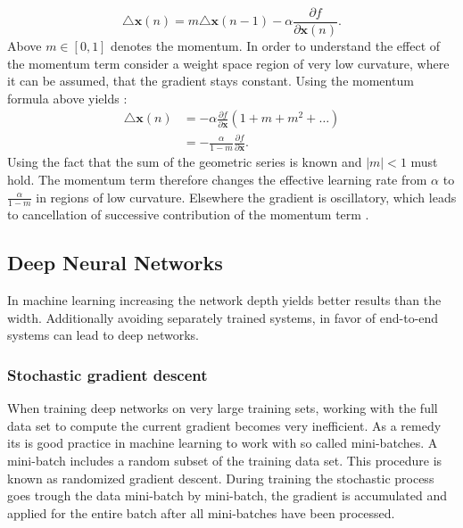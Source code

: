 \begin{equation}
\triangle \mathbf{x}(n) = m\triangle \mathbf{x}(n-1) -\alpha \frac{\partial f}{\partial \mathbf{x}(n)}.
\end{equation} 
Above $m \in [0,1]$ denotes the momentum. In order to understand the effect of the momentum term consider a weight space region of very low curvature, where it can be assumed, that the gradient stays constant. Using the momentum formula above yields \cite[page 267]{Bishop1995}:
\begin{align}
\triangle \mathbf{x}(n) &= -\alpha \frac{\partial f}{\partial \mathbf{x}} (1 + m + m^2 + \dots) \\
						&= -\frac{\alpha}{ 1 - m}\frac{\partial f}{\partial \mathbf{x}}.
\end{align}
Using the fact that the sum of the geometric series is known and $|m| < 1$ must hold. The momentum term therefore changes the effective learning rate from $\alpha$ to $\frac{\alpha}{ 1 - m}$ in regions of low curvature. Elsewhere the gradient is oscillatory, which leads to cancellation of successive contribution of the momentum term \cite[page 267]{Bishop1995}.

\subsection{Deep Neural Networks}
In machine learning increasing the network depth yields better results than the width. Additionally avoiding separately trained systems, in favor of end-to-end systems can lead to deep networks.


\subsubsection{Stochastic gradient descent}
When training deep  networks on very large training sets, working with the full data set to compute the current gradient becomes very inefficient. As a remedy its is good practice in machine learning to work with so called mini-batches. A mini-batch includes a random subset of the training data set. This procedure is known as randomized gradient descent. During training the stochastic process goes trough the data mini-batch by mini-batch, the gradient is accumulated and applied for the entire batch after all mini-batches have been processed. 

